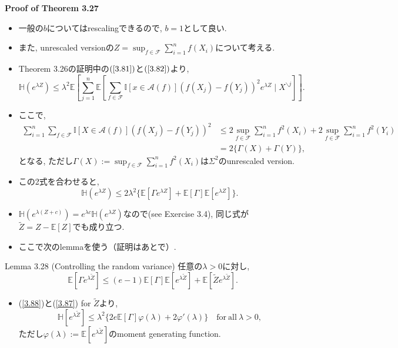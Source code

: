 \documentclass[aspectratio=169, dvipdfmx]{beamer}
\newcommand{\ex}{\mathbb{E}}
\newcommand{\bb}{\mathbb}
\newcommand{\cc}{\mathcal}
\begin{document}
\begin{frame}{}{}
{\bf Proof of Theorem 3.27}
\begin{itemize}
    \item 一般の$b$についてはrescalingできるので, $b=1$として良い.
    \item また, unrescaled versionの$Z = \sup_{f \in \cc{F}}\sum_{i=1}^n f(X_i)$について考える.
    \item Theorem 3.26の証明中の$(\ref{3.81})$と$(\ref{3.82})$より,
    \[
        \mathbb{H}\left(e^{\lambda Z}\right)
        \leq \lambda^{2} \mathbb{E}\left[\sum_{j=1}^{n} \mathbb{E}\left[\sum_{f \in \mathcal{F}} \mathbb{I}[x \in \mathcal{A}(f)]\left(f\left(X_{j}\right)-f\left(Y_{j}\right)\right)^{2} e^{\lambda Z} \mid X^{\backslash j}\right]\right].
    \]
    \item ここで,
    \begin{align*}
        \sum_{i=1}^{n} \sum_{f \in \mathcal{F}} \mathbb{I}[ X \in \mathcal { A } ( f ) ]\left(f\left(X_{j}\right)-f\left(Y_{j}\right)\right)^{2}
        & \leq 2 \sup _{f \in \mathcal{F}} \sum_{i=1}^{n} f^{2}\left(X_{i}\right)+2 \sup _{f \in \mathcal{F}} \sum_{i=1}^{n} f^{2}\left(Y_{i}\right) \\
        &=2\{\Gamma(X)+\Gamma(Y)\},
    \end{align*}
    となる, ただし$\Gamma(X) := \sup_{f \in \cc{F}} \sum_{i=1}^nf^2(X_i)$は$\Sigma^2$のunrescaled version.
\end{itemize}
\end{frame}

\begin{frame}
    \begin{itemize}
        \item この2式を合わせると, 
        \[
            \bb{H}(e^{\lambda Z})
            \le 2 \lambda^2 \{\ex[\Gamma e^{\lambda Z}] + \ex[\Gamma]\ex[e^{\lambda Z}]\}.
            \tag{3.87}\label{3.87}
        \]
        \item $\bb{H}(e^{\lambda(Z + c)}) = e^{\lambda c}\bb{H}(e^{\lambda Z})$なので(see Exercise 3.4),
              同じ式が$\widetilde{Z} = Z - \ex[Z]$でも成り立つ.
        \item ここで次のlemmaを使う（証明はあとで）.
    \end{itemize}
    \begin{block}{Lemma 3.28 (Controlling the random variance)}
        任意の$\lambda > 0$に対し,
        \[
            \mathbb{E}[\Gamma e^{\lambda \tilde{Z}}]
            \leq (e-1)\mathbb{E}[\Gamma] \mathbb{E}[e^{\lambda \widetilde{Z}}]+\mathbb{E}[\widetilde{Z} e^{\lambda \widetilde{Z}}].
            \tag{3.88}\label{3.88}
        \]
    \end{block}
    \begin{itemize}
        \item (\ref{3.88})と(\ref{3.87}) for $\widetilde{Z}$より,
        \[
            \bb{H}[e^{\lambda \widetilde{Z}}]
            \le \lambda^2 \{2e\ex[\Gamma]\varphi(\lambda) + 2\varphi'(\lambda)\}
            \quad \mathrm{for\ all}\ \lambda > 0,
        \]
        ただし$\varphi(\lambda) := \ex[e^{\lambda \widetilde{Z}}]$のmoment generating function.
    \end{itemize}
\end{frame}
\end{document}
